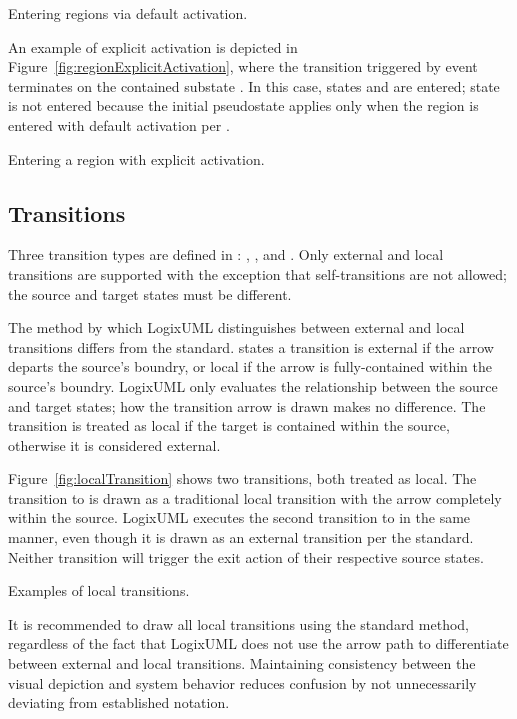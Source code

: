                {Entering regions via default activation.}

An example of explicit activation is depicted in
Figure~\ref{fig:regionExplicitActivation}, where the transition triggered
by event  terminates on the contained substate
. In this case, states  and
 are entered;
state  is not entered because the initial pseudostate
applies only when the region is entered with default activation per
\textcite[\S14.2.3.7]{OMGUML}.

               {Entering a region with explicit activation.}


\subsection{Transitions}

Three transition types are defined in \textcite[\S14.2.3.8.1]{OMGUML}:
, ,
and . Only external and local transitions
are supported with the exception that self-transitions are not allowed; the
source and target states must be different.

The method by which LogixUML distinguishes between external and local
transitions differs from the standard. \textcite[\S14.2.4.9]{OMGUML}
states a transition is external if the arrow departs the source's
boundry, or local if the arrow is fully-contained within the source's boundry.
LogixUML only evaluates the relationship between the source and target states;
how the transition arrow is drawn makes no difference. The transition is
treated as local if the target is contained within the source, otherwise
it is considered external.

Figure~\ref{fig:localTransition} shows two transitions, both
treated as local. The transition to  is drawn
as a traditional local transition with the arrow completely within the
source. LogixUML executes the second transition to  in the
same manner, even though it is drawn as an external transition per the
standard. Neither transition will trigger the exit action of their
respective source states.

               {Examples of local transitions.}

It is recommended to draw all local transitions using the standard method,
regardless of the fact that LogixUML does not use the arrow path
to differentiate between external and local transitions. Maintaining
consistency between the visual depiction and system behavior
reduces confusion by not unnecessarily deviating from established
notation.

